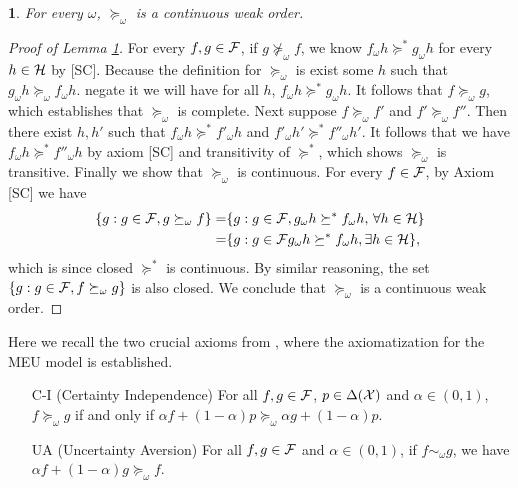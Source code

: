 \documentclass[11pt,oneside]{article}
\theoremstyle{plain}
\theoremstyle{plain}
\theoremstyle{plain}
\theoremstyle{plain}
\theoremstyle{plain}
\theoremstyle{definition}
\theoremstyle{definition}
\theoremstyle{remark}
\theoremstyle{plain}
\newtheorem{lem}[thm]{\protect\lemmaname}
\providecommand{\lemmaname}{Lemma}
\newcommand{\F}{{\cal F}}
\newcommand{\pfo}{\pf_\omega}
\newcommand{\mcx}{{\cal X}}
\newcommand{\pf}{\succeq}
\newcommand{\pfs}{\succeq^*}
\newcommand{\convmix}[2]{\alpha #1 + (1-\alpha) #2}
\newcommand{\omix}[2]{#1_\omega #2 }
\begin{document}
\begin{lem}
    \label{lem:state_dep_preference_lem}
    For every $\omega$, $\pf_\omega$ is a continuous weak order.
\end{lem}
\begin{proof}[Proof of Lemma \ref{lem:state_dep_preference_lem}]
    For every $f,g \in \F$, if $g \nsucceq_\omega f$, we know $\omix{f}{h} \pfs \omix{g}{h}$ for every $h\in {\cal H}$ by [SC]. Because the definition for $\pfo$ is exist some $h$ such that $ \omix{g}{h} \pfo \omix{f}{h}$. negate it we will have for all $h$, $\omix{f}{h} \pfs \omix{g}{h}$.
    It follows that $f\pf_\omega g$, which establishes that $\pf_\omega$ is complete. 
    Next suppose $f \pf_\omega f'$ and $f' \pf_\omega f''$. Then there exist $h,h'$ such that $\omix{f}{h} \pfs \omix{f'}{h}$ and $\omix{f'}{h'} \pfs \omix{f''}{h'}$. It follows that we have $\omix{f}{h} \pfs \omix{f''}{h}$ by axiom [SC] and transitivity of $\pfs$, which shows $\pf_\omega$ is transitive.
    Finally we show that $\pf_\omega$ is continuous. For every $f \in \F$, by Axiom [SC] we have
    \begin{align*}
    \{g:g\in \F, g\pf_\omega f\} = & \{g:g\in \F, g_\omega h \pfs f_\omega h,\, \forall h \in {\cal H}\}\\
    =& \{g:g\in \F g_\omega h \pfs f_\omega h, \exists h \in {\cal H}\},
    \end{align*}
    which is since closed $\pfs$ is continuous. 
    By similar reasoning, the set $\{g:g\in \F, f\pf_\omega g\}$ is also closed. We conclude that $\pf_\omega$ is a continuous weak order.
\end{proof}

Here we recall the two crucial axioms from \cite{gilboa1989maxmin}, where the axiomatization for the MEU model is established.
\begin{itemize}
    \item [C-I] (Certainty Independence) For all $f,g \in \F$, $p \in \Delta(\mcx)$ and $\alpha \in (0,1)$, $f \pf_\omega g$ if and only if
    $\convmix{f}{p} \pf_\omega \convmix{g}{p}.$
    \item [UA] (Uncertainty Aversion) For all $f,g \in \F$ and $\alpha \in (0,1)$, if $f \sim_\omega g$, we have $\convmix{f}{g} \pf_\omega f$.
\end{itemize}
\end{document}
